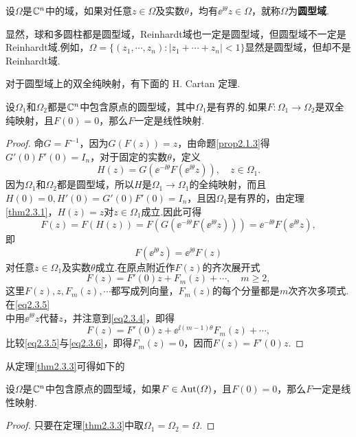 \begin{definition}\label{def2.3.2}
	设$\Omega$是$\mathbb C^n$中的域，如果对任意$z\in\Omega$及实数$\theta$，均有$\ee^{\ii\theta}z\in\Omega$，就称$\Omega$为\textbf{圆型域}.
\end{definition}
显然，球和多圆柱都是圆型域，Reinhardt域也一定是圆型域，但圆型域不一定是Reinhardt域.例如，$\Omega=\{(z_1,\cdots,z_n)\colon|z_1+\cdots+z_n|<1\}$显然是圆型域，但却不是Reinhardt域.

对于圆型域上的双全纯映射，有下面的 H. Cartan 定理.
\begin{theorem}\label{thm2.3.3}
	设$\Omega_1$和$\Omega_2$都是$\mathbb C^n$中包含原点的圆型域，其中$\Omega_1$是有界的.如果$F\colon\Omega_1\to\Omega_2$是双全纯映射，且$F(0)=0$，那么$F$一定是线性映射.
\end{theorem}
\begin{proof}
命$G=F^{-1}$，因为$G(F(z))=z$，由命题\ref{prop2.1.3}得$G'(0)F'(0)=I_n$，对于固定的实数$\theta$，定义
\[H(z)=G(\ee^{-\ii\theta}F(\ee^{\ii\theta}z)),\quad z\in\Omega_1.\]
因为$\Omega_1$和$\Omega_2$都是圆型域，所以$H$是$\Omega_1\to\Omega_1$的全纯映射，而且$H(0)=0,H'(0)=G'(0)F'(0)=I_n$，且因$\Omega_1$是有界的，由定理\ref{thm2.3.1}，$H(z)=z$对$z\in\Omega_1$成立.因此可得
\[F(z)=F(H(z))=F(G(\ee^{-\ii\theta}F(\ee^{\ii\theta}z)))=\ee^{-\ii\theta}F(\ee^{\ii\theta}z),\]
即
\begin{equation}\label{eq2.3.4}
	F(\ee^{\ii\theta}z)=\ee^{\ii\theta} F(z)
\end{equation}
对任意$z\in\Omega_1$及实数$\theta$成立.在原点附近作$F(z)$的齐次展开式
\begin{equation}\label{eq2.3.5}
	F(z)=F'(0)z+F_m(z)+\cdots,\quad m\ge2,
\end{equation}
这里$F(z),z,F_m(z),\cdots$都写成列向量，$F_m(z)$的每个分量都是$m$次齐次多项式.在\eqref{eq2.3.5}\\
中用$\ee^{\ii\theta}z$代替$z$，并注意到\eqref{eq2.3.4}，即得
\begin{equation}\label{eq2.3.6}
	F(z)=F'(0)z+\ee^{\ii(m-1)\theta} F_m(z)+\cdots,
\end{equation}
比较\eqref{eq2.3.5}与\eqref{eq2.3.6}，即得$F_m(z)=0$，因而$F(z)=F'(0)z$.
\end{proof}
从定理\ref{thm2.3.3}可得如下的
\begin{corollary}\label{cor2.3.4}
	设$\Omega$是$\mathbb C^n$中包含原点的圆型域，如果$F\in\operatorname{Aut}(\varOmega)$，且$F(0)=0$，那么$F$一定是线性映射.
\end{corollary}
\begin{proof}
	只要在定理\ref{thm2.3.3}中取$\Omega_1=\Omega_2=\Omega$.
\end{proof}
